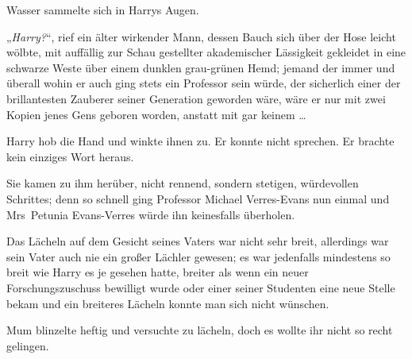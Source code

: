 Wasser sammelte sich in Harrys Augen.

„\emph{Harry?}“, rief ein älter wirkender Mann, dessen Bauch sich über der Hose leicht wölbte, mit auffällig zur Schau gestellter akademischer Lässigkeit gekleidet in eine schwarze Weste über einem dunklen grau-grünen Hemd; jemand der immer und überall wohin er auch ging stets ein Professor sein würde, der sicherlich einer der brillantesten Zauberer seiner Generation geworden wäre, wäre er nur mit zwei Kopien jenes Gens geboren worden, anstatt mit gar keinem …

Harry hob die Hand und winkte ihnen zu. Er konnte nicht sprechen. Er brachte kein einziges Wort heraus.

Sie kamen zu ihm herüber, nicht rennend, sondern stetigen, würdevollen Schrittes; denn so schnell ging Professor Michael Verres-Evans nun einmal und Mrs~Petunia Evans-Verres würde ihn keinesfalls überholen.

Das Lächeln auf dem Gesicht seines Vaters war nicht sehr breit, allerdings war sein Vater auch nie ein großer Lächler gewesen; es war jedenfalls mindestens so breit wie Harry es je gesehen hatte, breiter als wenn ein neuer Forschungszuschuss bewilligt wurde oder einer seiner Studenten eine neue Stelle bekam und ein breiteres Lächeln konnte man sich nicht wünschen.

Mum blinzelte heftig und versuchte zu lächeln, doch es wollte ihr nicht so recht gelingen.


